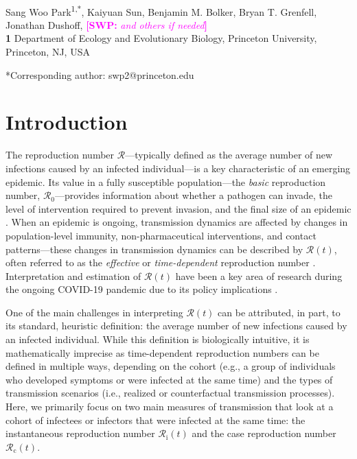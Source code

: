 \documentclass[12pt]{article}
\date{\today}
\newcommand{\comment}{\showcomment}
\newcommand{\showcomment}[3]{\textcolor{#1}{\textbf{[#2: }\textsl{#3}\textbf{]}}}
\newcommand{\swp}[1]{\comment{magenta}{SWP}{#1}}
\newcommand{\Rx}[1]{\ensuremath{{\mathcal R}_{#1}}\xspace}
\newcommand{\Ro}{\Rx{0}}
\newcommand{\Rc}{\Rx{\mathrm{c}}}
\newcommand{\Ri}{\Rx{\mathrm{i}}}
\newcommand{\RR}{\ensuremath{{\mathcal R}}\xspace}
\begin{document}
\begin{flushleft}{
	\Large
	\textbf{}
}
\newline
\\
Sang Woo Park\textsuperscript{1,*}, Kaiyuan Sun, Benjamin M. Bolker, Bryan T. Grenfell, Jonathan Dushoff, \swp{and others if needed}
\\
\bigskip
\textbf{1} Department of Ecology and Evolutionary Biology, Princeton University, Princeton, NJ, USA
\\
\bigskip

*Corresponding author: swp2@princeton.edu
\end{flushleft}

\section{Introduction}

The reproduction number \RR---typically defined as the average number of new infections caused by an infected individual---is a key characteristic of an emerging epidemic.
Its value in a fully susceptible population---the \emph{basic} reproduction number, \Ro---provides information about whether a pathogen can invade, the level of intervention required to prevent invasion, and the final size of an epidemic \citep{diekmann1990definition,anderson1991infectious}.
When an epidemic is ongoing, transmission dynamics are affected by changes in population-level immunity, non-pharmaceutical interventions, and contact patterns---these changes in transmission dynamics can be described by $\RR(t)$, often referred to as the \emph{effective} or \emph{time-dependent} reproduction number \citep{wallinga2004different, fraser2007estimating, cori2013new}.
Interpretation and estimation of $\RR(t)$ have been a key area of research during the ongoing COVID-19 pandemic due to its policy implications \citep{pan2020association,flaxman2020estimating,gostic2020practical}.

One of the main challenges in interpreting $\RR(t)$ can be attributed, in part, to its standard, heuristic definition: the average number of new infections caused by an infected individual.
While this definition is biologically intuitive, it is mathematically imprecise as time-dependent reproduction numbers can be defined in multiple ways, depending on the cohort (e.g., a group of individuals who developed symptoms or were infected at the same time) and the types of transmission scenarios (i.e., realized or counterfactual transmission processes).
Here, we primarily focus on two main measures of transmission that look at a cohort of infectees or infectors that were infected at the same time: the instantaneous reproduction number $\Ri(t)$ and the case reproduction number $\Rc(t)$.
\end{document}
